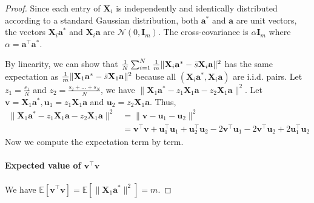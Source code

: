 \documentclass{article}
\theoremstyle{plain}
\theoremstyle{definition}
\theoremstyle{remark}
\begin{document}
\begin{proof}
    Since each entry of $\mathbf{X}_i$ is independently and identically distributed according to a standard Gaussian distribution, both $\mathbf{a}^*$ and $\mathbf{a}$ are unit vectors, the vectors $ \mathbf{X}_i \mathbf{a}^*$ and $ \mathbf{X}_i \mathbf{a}$ are $\mathcal{N}(0,\mathbf{I}_m)$. The cross-covariance is $\alpha \mathbf{I}_m$ where $\alpha = \mathbf{a}^\top \mathbf{a}^*$. 
    
    By linearity, we can show that $\frac{1}{N}\sum_{i=1}^{N}\frac{1}{m}\lVert \mathbf{X}_i \mathbf{a}^*- \Bar{s} \mathbf{X}_i \mathbf{a}\rVert^2$ has the same expectation as $\frac{1}{m}\lVert \mathbf{X}_1 \mathbf{a}^* - \Bar{s}\mathbf{X}_1 \mathbf{a} \rVert^2$ because all $(\mathbf{X}_i \mathbf{a}^*, \mathbf{X}_i \mathbf{a})$ are i.i.d. pairs. Let $z_1 = \frac{s_1}{N}$ and $z_2 = \frac{s_2+\dots + s_N}{N}$, we have $\lVert \mathbf{X}_1 \mathbf{a}^* - z_1\mathbf{X}_1 \mathbf{a} - z_2\mathbf{X}_1 \mathbf{a} \rVert^2$. Let $\mathbf v = \mathbf{X}_1 \mathbf{a}^*, \mathbf{u}_1 = z_1 \mathbf{X}_1 \mathbf{a}$ and $\mathbf{u}_2 = z_2 \mathbf{X}_1 \mathbf{a}$. Thus,
    \begin{align}
        \lVert \mathbf{X}_1 \mathbf{a}^* - z_1\mathbf{X}_1 \mathbf{a} - z_2\mathbf{X}_1 \mathbf{a} \rVert^2 &= \|\mathbf{v}-\mathbf{u}_1-\mathbf{u}_2 \|^2 \\
        & = \mathbf{v}^\top \mathbf{v} + \mathbf{u}_1^\top \mathbf{u}_1 + \mathbf{u}_2^\top \mathbf{u}_2 -2 \mathbf{v}^\top \mathbf{u}_1 - 2\mathbf{v}^\top \mathbf{u}_2 + 2 \mathbf{u}_1^\top \mathbf{u}_2 \label{expand}
    \end{align}
    Now we compute the expectation term by term.
    \paragraph{Expected value of $\mathbf{v}^\top \mathbf{v}$} We have $\mathbb{E}[\mathbf{v}^\top \mathbf{v}]= \mathbb{E}[\| \mathbf{X}_1 \mathbf{a}^*\|^2]=m$.

\end{proof}
\end{document}
